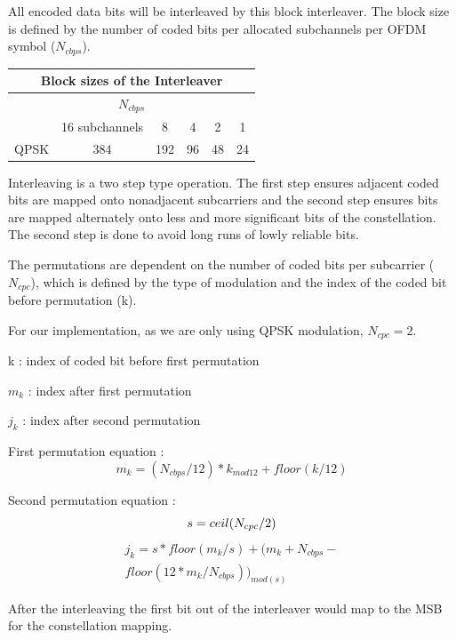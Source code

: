 \documentclass[dvips,10pt,twocolumn]{article}
\begin{document}
	All encoded data bits will be interleaved by this block interleaver. The
	block size is defined by the number of coded bits per allocated subchannels 
	per OFDM symbol ($N_{cbps}$). 
 
	 \begin{center}
  	\begin{tabular}{|c|c|c|c|c|c|}
	\hline
	\multicolumn{6}{|c|}{Block sizes of the Interleaver} \\ \hline
	\multicolumn{6}{|c|}{$N_{cbps}$} \\ \hline
  	& 16 subchannels & 8 & 4 & 2 & 1 \\ \hline
	QPSK & 384 & 192 & 96 & 48 & 24 \\ \hline
	\end{tabular}
  	\end{center}

	Interleaving is a two step type operation. The first step ensures adjacent 
	coded bits are mapped onto nonadjacent subcarriers and the second step 
	ensures bits are mapped alternately onto less and more significant bits of
	the constellation. The second step is done to avoid long runs of lowly
	reliable bits.
	 
	The permutations are dependent on the number of coded bits per subcarrier
	($N_{cpc}$), which is defined by the type of modulation and the index of the
	coded bit before permutation (k).

	For our implementation, as we are only using QPSK modulation,
	$N_{cpc} = 2$.
	
	k : index of coded bit before first permutation

	$m_{k}$ : index after first permutation

	$j_{k}$ : index after second permutation 

  First permutation equation :
  \begin{equation}
  m_k = (N_{cbps}/12)*k_{mod12}+floor(k/12)
  \end{equation}

	Second permutation equation :
	\begin{equation}
	s=ceil(N_{cpc}/2) \\
	\end{equation}
	\begin{eqnarray}
	j_k = s*floor(m_{k}/s)+(m_{k}+N_{cbps}- \nonumber \\
		floor(12*m_k/N_{cbps}))_{mod(s)}
	\end{eqnarray}

	After the interleaving the first bit out of the interleaver would map to the
	MSB for the constellation mapping. 
	
\end{document}
